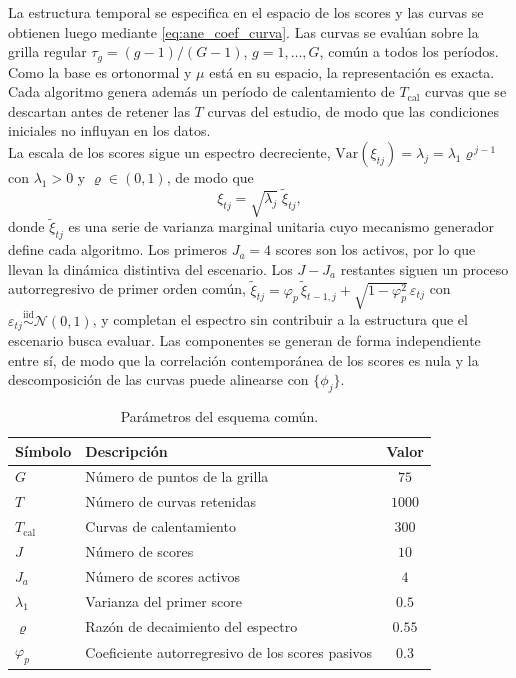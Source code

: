 La estructura temporal se especifica en el espacio de los scores y las curvas se obtienen luego mediante \eqref{eq:ane_coef_curva}. Las curvas se evalúan sobre la grilla regular $\tau_g = (g-1)/(G-1)$, $g = 1, \dots, G$, común a todos los períodos. Como la base es ortonormal y $\mu$ está en su espacio, la representación es exacta.\\

Cada algoritmo genera además un período de calentamiento de $T_{\mathrm{cal}}$ curvas que se descartan antes de retener las $T$ curvas del estudio, de modo que las condiciones iniciales no influyan en los datos.\\

La escala de los scores sigue un espectro decreciente, $\mathrm{Var}(\xi_{tj})=\lambda_j=\lambda_1 \varrho^{\,j-1}$ con $\lambda_1>0$ y $\varrho\in(0,1)$, de modo que
\begin{equation}
\label{eq:ane_escala}
\xi_{tj} = \sqrt{\lambda_j}\; \tilde{\xi}_{tj},
\end{equation}
donde $\tilde{\xi}_{tj}$ es una serie de varianza marginal unitaria cuyo mecanismo generador define cada algoritmo. Los primeros $J_a=4$ scores son los activos, por lo que llevan la dinámica distintiva del escenario. Los $J-J_a$ restantes siguen un proceso autorregresivo de primer orden común, $\tilde{\xi}_{tj}=\varphi_p\, \tilde{\xi}_{t-1,j}+\sqrt{1-\varphi_p^{2}}\,\varepsilon_{tj}$ con $\varepsilon_{tj}\overset{\mathrm{iid}}{\sim}\mathcal{N}(0,1)$, y completan el espectro sin contribuir a la estructura que el escenario busca evaluar. Las componentes se generan de forma independiente entre sí, de modo que la correlación contemporánea de los scores es nula y la descomposición de las curvas puede alinearse con $\{\phi_j\}$.\\

\begin{table}[H]
\centering
\caption{Parámetros del esquema común.}
\label{tab:ane_comun}
\begin{tabular}{llc}
\hline
Símbolo & Descripción & Valor \\
\hline
$G$          & Número de puntos de la grilla                             & $75$ \\
$T$          & Número de curvas retenidas                                & $1000$ \\
$T_{\mathrm{cal}}$        & Curvas de calentamiento                                   & $300$ \\
$J$          & Número de scores                                          & $10$ \\
$J_a$        & Número de scores activos                                  & $4$ \\
$\lambda_1$  & Varianza del primer score                                 & $0.5$ \\
$\varrho$    & Razón de decaimiento del espectro                        & $0.55$ \\
$\varphi_p$     & Coeficiente autorregresivo de los scores pasivos          & $0.3$ \\
\hline
\end{tabular}
\end{table}

